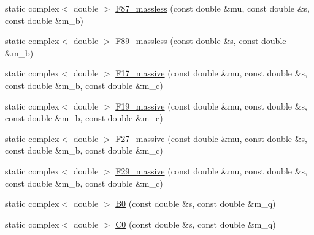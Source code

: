 \begin{DoxyCompactItemize}
static complex$<$ double $>$ \hyperlink{structeos_1_1CharmLoops_a81ea6bfba7981c218c0c94ed79688266}{F87\_\-massless} (const double \&mu, const double \&s, const double \&m\_\-b)
\item 
static complex$<$ double $>$ \hyperlink{structeos_1_1CharmLoops_a02dd5d2de6eb110c9dc4abe8db9329b0}{F89\_\-massless} (const double \&s, const double \&m\_\-b)
\item 
static complex$<$ double $>$ \hyperlink{structeos_1_1CharmLoops_ab9c16844121670118512a2d47f74284e}{F17\_\-massive} (const double \&mu, const double \&s, const double \&m\_\-b, const double \&m\_\-c)
\item 
static complex$<$ double $>$ \hyperlink{structeos_1_1CharmLoops_a4ed440c1f33914e6c2e5b825b24e384e}{F19\_\-massive} (const double \&mu, const double \&s, const double \&m\_\-b, const double \&m\_\-c)
\item 
static complex$<$ double $>$ \hyperlink{structeos_1_1CharmLoops_a84b926651e9df767d4d3fe0d37c4bdf2}{F27\_\-massive} (const double \&mu, const double \&s, const double \&m\_\-b, const double \&m\_\-c)
\item 
static complex$<$ double $>$ \hyperlink{structeos_1_1CharmLoops_ac670d235f7b371739d54e2c731dac27b}{F29\_\-massive} (const double \&mu, const double \&s, const double \&m\_\-b, const double \&m\_\-c)
\item 
static complex$<$ double $>$ \hyperlink{structeos_1_1CharmLoops_a12035607b29d252a6eab317c850255b7}{B0} (const double \&s, const double \&m\_\-q)
\item 
static complex$<$ double $>$ \hyperlink{structeos_1_1CharmLoops_a0d4ed4a2d4d8e9c3c353bf1922e78c77}{C0} (const double \&s, const double \&m\_\-q)
\end{DoxyCompactItemize}



